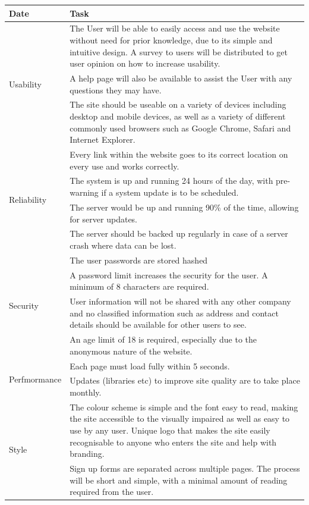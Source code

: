 \documentclass[12pt]{article}
\begin{document}
\begin{table}[ht!]
    \centering
    \begin{tabular}{|p{2.5cm}|p{12cm}|}
        \hline
        Date & Task\\
        \hline
        \multirow{3}{2.5cm}{Usability} & The User will be able to easily access
        and use the website without need for prior knowledge, due to its simple
        and intuitive design. A survey to users will be distributed to get user
        opinion on how to increase usability.\\
        \cline{2-2}
        & A help page will also be available to assist the User with any questions they may have. \\
        \cline{2-2}
        & The site should be useable on a variety of devices including desktop
        and mobile devices, as well as a variety of different commonly used
        browsers such as Google Chrome, Safari and Internet Explorer.\\
        \hline
        \multirow{4}{2.5cm}{Reliability} & Every link within the website goes to
        its correct location on every use and works correctly.\\
        \cline{2-2}
        & The system is up and running 24 hours of the day, with pre-warning if
        a system update is to be scheduled.\\
        \cline{2-2}
        & The server would be up and running 90\% of the time, allowing for
        server updates.\\
        \cline{2-2}
        & The server should be backed up regularly in case of a server crash
        where data can be lost.\\
        \hline
        \multirow{4}{2.5cm}{Security} & The user passwords are stored hashed\\
        & A password limit increases the security for the user. A minimum of 8
        characters are required.\\
        \cline{2-2}
        & User information will not be shared with any other company and no
        classified information such as address and contact details should be
        available for other users to see.\\
        \cline{2-2}
        & An age limit of 18 is required, especially due to the anonymous
        nature of the website.\\
        \hline
        \multirow{2}{2.5cm}{Perfmormance} & Each page must load fully within 5 seconds.\\
        & Updates (libraries etc) to improve site quality are to take place monthly.\\
        \hline
        \multirow{2}{2.5cm}{Style} & The colour scheme is simple and the font
        easy to read, making the site accessible to the visually impaired as
        well as easy to use by any user. Unique logo that makes the site easily
        recognisable to anyone who enters the site and help with branding.\\
        \cline{2-2}
        & Sign up forms are separated across multiple pages. The process will
	be short and simple, with a minimal amount of reading required from the
	user.\\
        \hline


\end{tabular}
\end{table}
\end{document}
